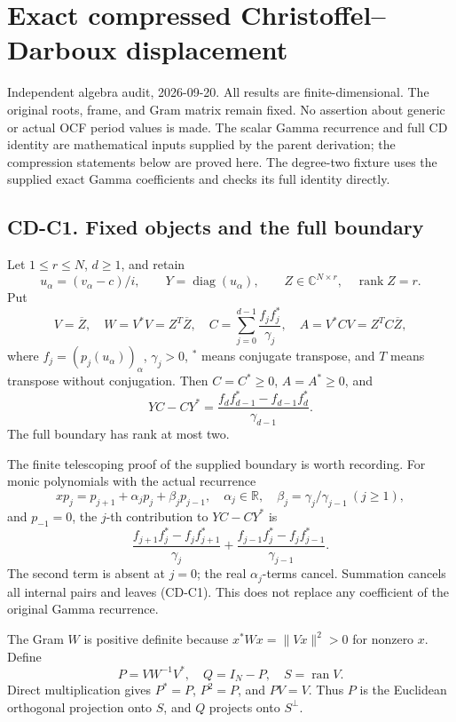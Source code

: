 \documentclass[11pt]{article}
\begin{document}
\section{Exact compressed Christoffel--Darboux displacement}\label{exact-compressed-christoffeldarboux-displacement}

Independent algebra audit, 2026-09-20. All results are finite-dimensional. The original roots, frame, and Gram matrix remain fixed. No assertion about generic or actual OCF period values is made. The scalar Gamma recurrence and full CD identity are mathematical inputs supplied by the parent derivation; the compression statements below are proved here. The degree-two fixture uses the supplied exact Gamma coefficients and checks its full identity directly.

\subsection{CD-C1. Fixed objects and the full boundary}\label{cd-c1.-fixed-objects-and-the-full-boundary}

Let \(1\le r\le N\), \(d\ge1\), and retain \[
u_\alpha=(v_\alpha-c)/i,\qquad Y=\operatorname{diag}(u_\alpha),\qquad
Z\in\mathbb C^{N\times r},\quad \operatorname{rank}Z=r.
\] Put \[
V=\overline Z,\quad W=V^*V=Z^T\overline Z,\quad
C=\sum_{j=0}^{d-1}\frac{f_jf_j^*}{\gamma_j},\quad
A=V^*CV=Z^TC\overline Z,
\] where \(f_j=(p_j(u_\alpha))_\alpha\), \(\gamma_j>0\), \(^{*}\) means conjugate transpose, and \(T\) means transpose without conjugation. Then \(C=C^*\ge0\), \(A=A^*\ge0\), and \[
YC-CY^*=\frac{f_df_{d-1}^*-f_{d-1}f_d^*}{\gamma_{d-1}}.
\tag{CD-C1}
\] The full boundary has rank at most two.

The finite telescoping proof of the supplied boundary is worth recording. For monic polynomials with the actual recurrence \[
xp_j=p_{j+1}+\alpha_jp_j+\beta_jp_{j-1},\quad
\alpha_j\in\mathbb R,\quad \beta_j=\gamma_j/\gamma_{j-1}\ (j\ge1),
\] and \(p_{-1}=0\), the \(j\)-th contribution to \(YC-CY^*\) is \[
\frac{f_{j+1}f_j^*-f_jf_{j+1}^*}{\gamma_j}
+\frac{f_{j-1}f_j^*-f_jf_{j-1}^*}{\gamma_{j-1}}.
\] The second term is absent at \(j=0\); the real \(\alpha_j\)-terms cancel. Summation cancels all internal pairs and leaves (CD-C1). This does not replace any coefficient of the original Gamma recurrence.

The Gram \(W\) is positive definite because \(x^*Wx=\|Vx\|^2>0\) for nonzero \(x\). Define \[
P=VW^{-1}V^*,\quad Q=I_N-P,\quad S=\operatorname{ran}V.
\] Direct multiplication gives \(P^*=P\), \(P^2=P\), and \(PV=V\). Thus \(P\) is the Euclidean orthogonal projection onto \(S\), and \(Q\) projects onto \(S^\perp\).
\end{document}
